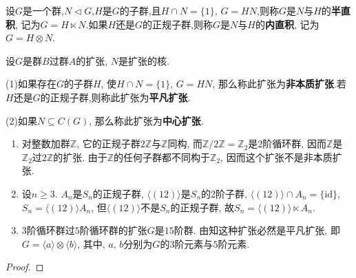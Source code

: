 \documentclass[../../main.tex]{subfiles}%
\begin{document}
\begin{definition}
设$G$是一个群,$N\lhd G$,$H$是$G$的子群,且$H\cap N = \{1\}$, $G = HN$,则称$G$是$N$与$H$的\textbf{半直积}, 记为$G = H\ltimes N$.如果$H$还是$G$的正规子群,则称$G$是$N$与$H$的\textbf{内直积}, 记为$G = H\otimes N$.
\end{definition}

\begin{definition}\label{definition:内直积和中心扩张定义}
设$G$是群$B$过群$A$的扩张, $N$是扩张的核. 

(1)如果存在$G$的子群$H$, 使$H\cap N = \{1\}$, $G = HN$, 那么称此扩张为\textbf{非本质扩张}.若$H$还是$G$的正规子群,则称此扩张为\textbf{平凡扩张}.

(2)如果$N\subseteq C(G)$, 那么称此扩张为\textbf{中心扩张}.
\end{definition}

\begin{example}
\begin{enumerate}
\item 对整数加群$\mathbb{Z}$, 它的正规子群$2\mathbb{Z}$与$\mathbb{Z}$同构, 而$\mathbb{Z}/2\mathbb{Z} = \mathbb{Z}_2$是$2$阶循环群, 因而$\mathbb{Z}$是$\mathbb{Z}_2$过$2\mathbb{Z}$的扩张. 由于$\mathbb{Z}$的任何子群都不同构于$\mathbb{Z}_2$, 因而这个扩张不是非本质扩张.
\item 设$n\geqslant 3$. $A_n$是$S_n$的正规子群, $\langle(12)\rangle$是$S_n$的$2$阶子群, $\langle(12)\rangle\cap A_n = \{\text{id}\}$, $S_n = \langle(12)\rangle A_n$, 但$\langle(12)\rangle$不是$S_n$的正规子群, 故$S_n = \langle(12)\rangle\ltimes A_n$.
\item $3$阶循环群过$5$阶循环群的扩张$G$是$15$阶群. 由知这种扩张必然是平凡扩张, 即$G = \langle a\rangle\otimes\langle b\rangle$, 其中, $a$, $b$分别为$G$的$3$阶元素与$5$阶元素.
\end{enumerate}
\end{example}
\begin{proof}

\end{proof}
\end{document}
